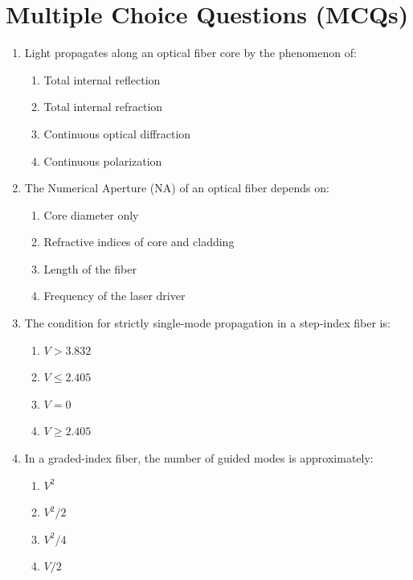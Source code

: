 \section{Multiple Choice Questions (MCQs)}

\begin{enumerate}
    \item Light propagates along an optical fiber core by the phenomenon of:
    \begin{enumerate}
        \item Total internal reflection
        \item Total internal refraction
        \item Continuous optical diffraction
        \item Continuous polarization
    \end{enumerate}
    
    \item The Numerical Aperture ($\text{NA}$) of an optical fiber depends on:
    \begin{enumerate}
        \item Core diameter only
        \item Refractive indices of core and cladding
        \item Length of the fiber
        \item Frequency of the laser driver
    \end{enumerate}
    
    \item The condition for strictly single-mode propagation in a step-index fiber is:
    \begin{enumerate}
        \item $V > 3.832$
        \item $V \le 2.405$
        \item $V = 0$
        \item $V \ge 2.405$
    \end{enumerate}
    
    \item In a graded-index fiber, the number of guided modes is approximately:
    \begin{enumerate}
        \item $V^2$
        \item $V^2 / 2$
        \item $V^2 / 4$
        \item $V / 2$
    \end{enumerate}
    

\end{enumerate}
